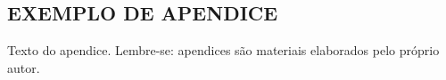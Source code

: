 
\begin{apendicesenv}
	
	
	\renewcommand{\thetable}{\Alph{chapter}\arabic{table}}
	\setcounter{table}{0}
	\clearpage
		\begingroup%
		\makeatletter%
		\let\clearpage\relax
		\vspace*{\fill}%
		\vspace*{\dimexpr-50\p@-\baselineskip}
		\chapter{EXEMPLO DE APENDICE}
		\vspace*{\fill}%
		\endgroup 
	\clearpage

	
	Texto do apendice. Lembre-se: apendices são materiais elaborados pelo próprio autor.
	
	
\end{apendicesenv}

